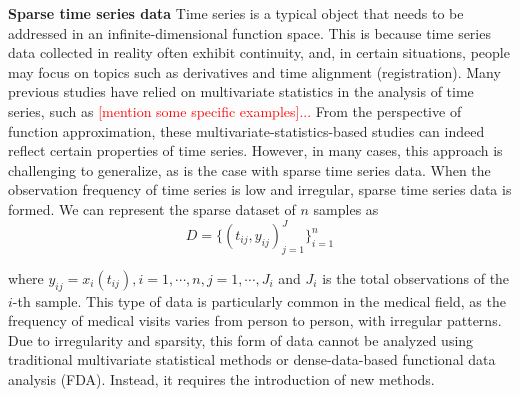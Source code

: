 \documentclass{article}
\begin{document}
\textbf{Sparse time series data}
Time series is a typical object that needs to be addressed in an infinite-dimensional function space. 
This is because time series data collected in reality often exhibit continuity, and, in certain situations, people may focus on topics such as derivatives and time alignment (registration).
Many previous studies have relied on multivariate statistics in the analysis of time series, such as \textcolor{red}{[mention some specific examples]...}
From the perspective of function approximation, these multivariate-statistics-based studies can indeed reflect certain properties of time series. 
However, in many cases, this approach is challenging to generalize, as is the case with sparse time series data.
When the observation frequency of time series is low and irregular, sparse time series data is formed. 
We can represent the sparse dataset of $n$ samples as 
$$
D=\{(t_{ij},y_{ij})_{j=1}^{J}\}_{i=1}^n
$$

where
$y_{ij}=x_i(t_{ij}) , i=1, \cdots, n, j=1, \cdots, J_i$ and $J_i$ is the total observations of the $i$-th sample.
This type of data is particularly common in the medical field, as the frequency of medical visits varies from person to person, with irregular patterns.
Due to irregularity and sparsity, this form of data cannot be analyzed using traditional multivariate statistical methods or dense-data-based functional data analysis (FDA). Instead, it requires the introduction of new methods.
\end{document}

